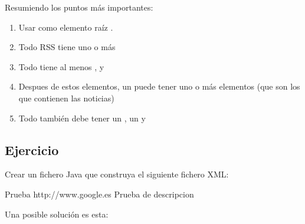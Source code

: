 \documentclass[letterpaper,10pt,spanish]{sphinxmanual}
\begin{document}
Resumiendo los puntos más importantes:
\begin{enumerate}
\item {} 
Usar como elemento raíz .

\item {} 
Todo RSS tiene uno o más 

\item {} 
Todo  tiene al menos ,  y 

\item {} 
Despues de estos elementos, un  puede tener uno o más elementos  (que son los que contienen las noticias)

\item {} 
Todo  también debe tener un , un  y 

\end{enumerate}


\subsection{Ejercicio}
\label{\detokenize{tema7:ejercicio}}
Crear un fichero Java que construya el siguiente fichero XML:

\begin{sphinxVerbatim}[commandchars=\\\{\}]
 
                Prueba
                http://www.google.es
                Prueba de descripcion
\end{sphinxVerbatim}

Una posible solución es esta:
\end{document}
